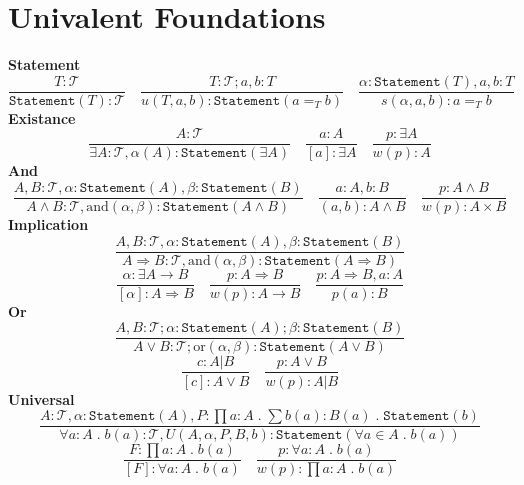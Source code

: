 \documentclass{article}
\newcommand{\Type}{\mathcal{T}}
\newcommand{\is}{:}
\newcommand{\st}{\mathtt{Statement}}
\renewcommand{\.}{\; . \;}
\begin{document}
\section{Univalent Foundations}
\textbf{Statement} \\

$$\frac{T:\Type}{\st (T) \is \Type} \quad 
\frac{T \is \Type; a,b \is T}{u(T,a,b):\st(a =_T b)} \quad
\frac{\alpha : \st(T),a,b:T}{s(\alpha,a,b) : a =_T b}$$
\textbf{Existance}
$$
\frac{A \is \Type}{\exists A \is \Type, \alpha(A) : \st(\exists A)} 
\quad
\frac{a : A}{[a] : \exists A}
\quad
\frac{p : \exists A}{w(p) : A}
$$
\textbf{And}
$$
\frac{A,B \is \Type, \alpha : \st(A), \beta : \st(B)}
{ A \wedge B \is \Type, \mathrm{and}(\alpha,\beta) : \st( A \wedge B )} 
\quad
\frac{a : A, b : B}{(a,b) : A \wedge B }
\quad
\frac{p :  A \wedge B}{w(p) : A \times B}
$$
\textbf{Implication}
$$
\frac{A,B \is \Type, \alpha : \st(A), \beta : \st(B)}
{ A \Rightarrow B \is \Type, \mathrm{and}(\alpha,\beta) : \st( A \Rightarrow B )} 
$$ 
$$
\frac{\alpha \is \exists  A \to B }{[\alpha] : A \Rightarrow B }
\quad
\frac{p :  A \Rightarrow B}{w(p) : A \to B}
\quad
\frac{p:A \Rightarrow B, a : A}{p(a) : B}
$$
\textbf{Or}
$$
\frac{A,B \is \Type ; \alpha : \st(A); \beta : \st(B)}
{A \vee B \is \Type; \mathrm{or}(\alpha,\beta) : \st(A \vee B)}
$$
$$
\frac{c : A|B}{[c] : A \vee B} \quad \frac{p : A \vee B}{w(p) : A | B} 
$$
\textbf{Universal}
$$
\frac{A \is \Type, \alpha : \st(A), P : \prod a : A  \. \sum b(a) : B(a) \. \st(b)}
{\forall a : A \. b(a) \is \Type, U(A,\alpha,P,B,b) : \st\left(  \forall a \in A \. b(a)\right)}
$$
$$
\frac{F \is \prod a \is A \. b(a)}{[F] \is \forall a \is A \. b(a)}
\quad
\frac{p \is \forall a \is A \. b(a)}{w(p) : \prod a : A \. b(a) }
$$
\end{document}
